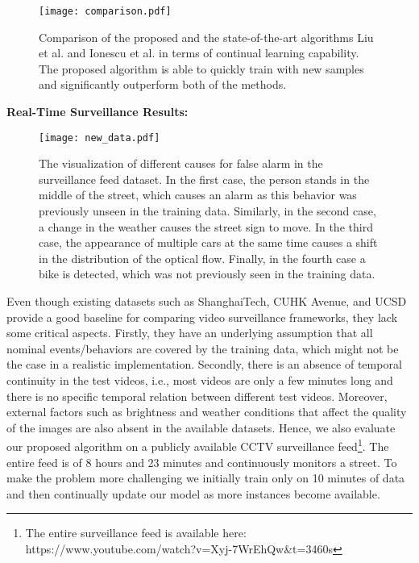 \begin{figure}[th]
\centering
\texttt{[image: comparison.pdf]}
\vspace{-2mm}
\caption{Comparison of the proposed and the state-of-the-art algorithms Liu et al. \cite{liu2018future} and Ionescu et al. \cite{ionescu2019object} in terms of continual learning capability. The proposed algorithm is able to quickly train with new samples and significantly outperform both of the methods.}
\label{f:continual}
\vspace{-2mm}
\end{figure}

\textbf{Real-Time Surveillance Results:}
\begin{figure*}[th]
\centering
\texttt{[image: new\_data.pdf]}
\vspace{-2mm}
\caption{The visualization of different causes for false alarm in the surveillance feed dataset. In the first case, the person stands in the middle of the street, which causes an alarm as this behavior was previously unseen in the training data. Similarly, in the second case, a change in the weather causes the street sign to move. In the third case, the appearance of multiple cars at the same time causes a shift in the distribution of the optical flow. Finally, in the fourth case a bike is detected, which was not previously seen in the training data.}
\vspace{-2mm}
\end{figure*}
Even though existing datasets such as ShanghaiTech, CUHK Avenue, and UCSD provide a good baseline for comparing video surveillance frameworks, they lack some critical aspects. Firstly, they have an underlying assumption that all nominal events/behaviors are covered by the training data, which might not be the case in a realistic implementation. Secondly, there is an absence of temporal continuity in the test videos, i.e., most videos are only a few minutes long and there is no specific temporal relation between different test videos. Moreover, external factors such as brightness and weather conditions that affect the quality of the images are also absent in the available datasets. Hence, we also evaluate our proposed algorithm on a publicly available CCTV surveillance feed\footnote{The entire surveillance feed is available here: https://www.youtube.com/watch?v=Xyj-7WrEhQw\&t=3460s}. The entire feed is of 8 hours and 23 minutes and continuously monitors a street. To make the problem more challenging we initially train only on 10 minutes of data and then continually update our model as more instances become available. 



